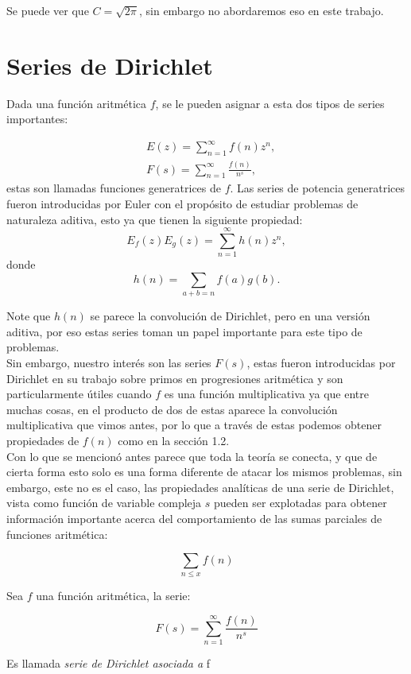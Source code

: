 Se puede ver que $C=\sqrt{2\pi}$, sin embargo no abordaremos eso en este trabajo.

\section{Series de Dirichlet}

Dada una función aritmética $f$, se le pueden asignar a esta dos tipos de series importantes:

$$
\begin{aligned}
& E(z)=\sum_{n=1}^{\infty} f(n) z^n, \\
& F(s)=\sum_{n=1}^{\infty} \frac{f(n)}{n^s},
\end{aligned}
$$
estas son llamadas funciones generatrices de $f$.
Las series de potencia generatrices fueron introducidas por Euler con el propósito de estudiar problemas de naturaleza aditiva, esto ya que tienen la siguiente propiedad:\\

$$
E_f(z) E_g(z)=\sum_{n=1}^{\infty} h(n) z^n,
$$
donde
$$
h(n)=\sum_{a+b=n} f(a) g(b) .
$$

Note que $h(n)$ se parece la convolución de Dirichlet, pero en una versión aditiva, por eso estas series toman un papel importante para este tipo de problemas.\\

Sin embargo, nuestro interés son las series $F(s)$, estas fueron introducidas por Dirichlet en su trabajo sobre primos en progresiones aritmética y son particularmente útiles cuando $f$ es una función multiplicativa ya que entre muchas cosas, en el producto de dos de  estas aparece la convolución multiplicativa que vimos antes, por lo que a través de estas podemos obtener propiedades de $f(n)$ como en la sección 1.2.\\

Con lo que se mencionó antes parece que toda la teoría se conecta, y que de cierta forma esto solo es una forma diferente de atacar los mismos problemas, sin embargo, este no es el caso, las propiedades analíticas de una serie de Dirichlet, vista como función de variable compleja $s$ pueden ser explotadas para obtener información importante acerca del comportamiento de las sumas parciales de funciones aritmética:

$$\sum_{n\leq x}f(n)$$

\begin{definition}

Sea $f$ una función aritmética, la serie:

$$F(s)=\sum_{n=1}^{\infty}\frac{f(n)}{n^s}$$

Es llamada \textit{serie de Dirichlet asociada a} f

\end{definition}

